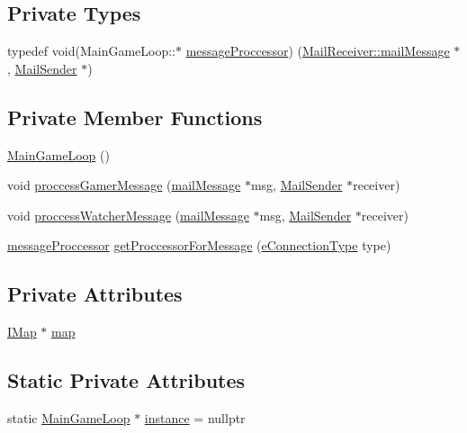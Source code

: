 \subsection*{Private Types}
\begin{DoxyCompactItemize}
\item 
typedef void(Main\+Game\+Loop\+::$\ast$ \hyperlink{a00209_a3aecf6efe74a0fe8b40e2d28bf4032ba}{message\+Proccessor}) (\hyperlink{a00201}{Mail\+Receiver\+::mail\+Message} $\ast$, \hyperlink{a00205}{Mail\+Sender} $\ast$)
\end{DoxyCompactItemize}
\subsection*{Private Member Functions}
\begin{DoxyCompactItemize}
\item 
\hyperlink{a00209_a0632599cb00fa2c86ba1c71904c1f59f}{Main\+Game\+Loop} ()
\item 
void \hyperlink{a00209_ac7722494194e946c7d045471858c3aee}{proccess\+Gamer\+Message} (\hyperlink{a00201}{mail\+Message} $\ast$msg, \hyperlink{a00205}{Mail\+Sender} $\ast$receiver)
\item 
void \hyperlink{a00209_a26ac1e61f11a51a84b6f2e770808d162}{proccess\+Watcher\+Message} (\hyperlink{a00201}{mail\+Message} $\ast$msg, \hyperlink{a00205}{Mail\+Sender} $\ast$receiver)
\item 
\hyperlink{a00209_a3aecf6efe74a0fe8b40e2d28bf4032ba}{message\+Proccessor} \hyperlink{a00209_ab9de0ceedab969b5f7fd9e1131bc4cd5}{get\+Proccessor\+For\+Message} (\hyperlink{a00008_ab66d8802c50493de7d50e181d6f8e296}{e\+Connection\+Type} type)
\end{DoxyCompactItemize}
\subsection*{Private Attributes}
\begin{DoxyCompactItemize}
\item 
\hyperlink{a00165}{I\+Map} $\ast$ \hyperlink{a00209_ae0ccec14d7db91cf6db41349a73b41a7}{map}
\end{DoxyCompactItemize}
\subsection*{Static Private Attributes}
\begin{DoxyCompactItemize}
\item 
static \hyperlink{a00209}{Main\+Game\+Loop} $\ast$ \hyperlink{a00209_a2578ca393ef9030407e5b3ac17b9f6ab}{instance} = nullptr
\end{DoxyCompactItemize}


